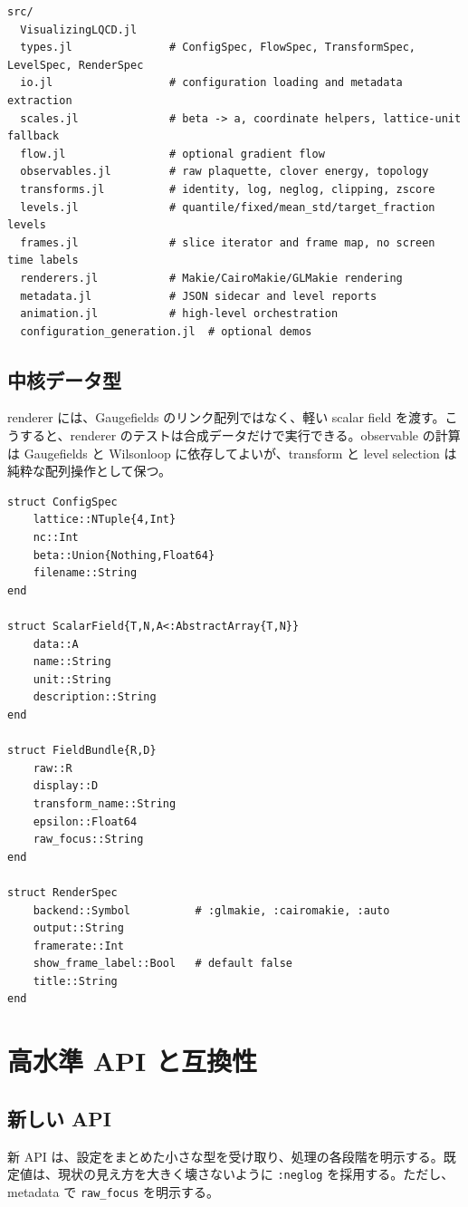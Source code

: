 \documentclass[uplatex,dvipdfmx,ja=standard,11pt,a4paper]{bxjsarticle}
\newcommand{\code}[1]{\texttt{#1}}
\begin{document}
\begin{lstlisting}[style=julia,caption={推奨する src 構造}]
src/
  VisualizingLQCD.jl
  types.jl               # ConfigSpec, FlowSpec, TransformSpec, LevelSpec, RenderSpec
  io.jl                  # configuration loading and metadata extraction
  scales.jl              # beta -> a, coordinate helpers, lattice-unit fallback
  flow.jl                # optional gradient flow
  observables.jl         # raw plaquette, clover energy, topology
  transforms.jl          # identity, log, neglog, clipping, zscore
  levels.jl              # quantile/fixed/mean_std/target_fraction levels
  frames.jl              # slice iterator and frame map, no screen time labels
  renderers.jl           # Makie/CairoMakie/GLMakie rendering
  metadata.jl            # JSON sidecar and level reports
  animation.jl           # high-level orchestration
  configuration_generation.jl  # optional demos
\end{lstlisting}

\subsection{中核データ型}
renderer には、Gaugefields のリンク配列ではなく、軽い scalar field を渡す。こうすると、renderer のテストは合成データだけで実行できる。observable の計算は Gaugefields と Wilsonloop に依存してよいが、transform と level selection は純粋な配列操作として保つ。

\begin{lstlisting}[style=julia,caption={中核データ型のスケッチ}]
struct ConfigSpec
    lattice::NTuple{4,Int}
    nc::Int
    beta::Union{Nothing,Float64}
    filename::String
end

struct ScalarField{T,N,A<:AbstractArray{T,N}}
    data::A
    name::String
    unit::String
    description::String
end

struct FieldBundle{R,D}
    raw::R
    display::D
    transform_name::String
    epsilon::Float64
    raw_focus::String
end

struct RenderSpec
    backend::Symbol          # :glmakie, :cairomakie, :auto
    output::String
    framerate::Int
    show_frame_label::Bool   # default false
    title::String
end
\end{lstlisting}

\section{高水準 API と互換性}
\subsection{新しい API}
新 API は、設定をまとめた小さな型を受け取り、処理の各段階を明示する。既定値は、現状の見え方を大きく壊さないように \code{:neglog} を採用する。ただし、metadata で \code{raw\_focus} を明示する。
\end{document}
